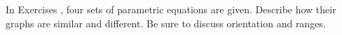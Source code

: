 {\noindent In Exercises}
{, four sets of parametric equations are given. Describe how their graphs are similar and different. Be sure to discuss orientation and ranges.
}
